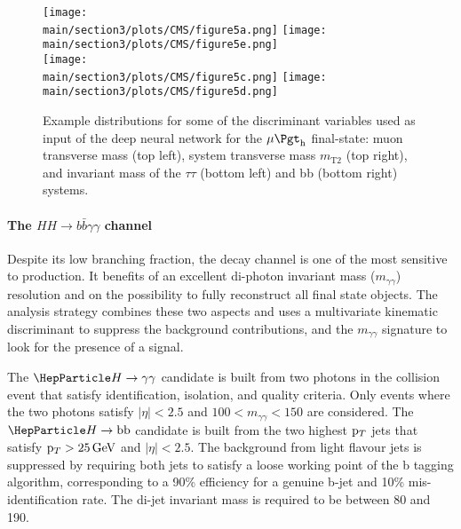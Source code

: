 \begin{figure}[!htb]
\centering 
    \texttt{[image: \\main/section3/plots/CMS/figure5a.png]}
    \texttt{[image: \\main/section3/plots/CMS/figure5e.png]}\\
    \texttt{[image: \\main/section3/plots/CMS/figure5c.png]}
    \texttt{[image: \\main/section3/plots/CMS/figure5d.png]}\\    
\caption{Example distributions for some of the discriminant variables used as input of the \bbtt deep neural network for the $\mu\tauh$ final-state: muon transverse mass (top left), system transverse mass $m_\text{T2}$ (top right), and invariant mass of the $\tau\tau$ (bottom left) and bb (bottom right) systems.} 
\label{sec3:CMSHH:fig:bbttinputs} 
\end{figure}


\paragraph{The $HH \rightarrow b\bar{b}\gamma\gamma$ channel}

Despite its low branching fraction, the \bbgg decay channel is one of the most sensitive to \HH production.
It benefits of an excellent di-photon invariant mass ($m_{\gamma\gamma}$) resolution and on the possibility to fully reconstruct all final state objects.
The analysis strategy combines these two aspects and uses a multivariate kinematic discriminant to suppress the background contributions, and the $m_{\gamma\gamma}$ signature to look for the presence of a signal.

The $\PH\to\gamma\gamma$ candidate is built from two photons in the collision event that satisfy identification, isolation, and quality criteria.
Only events where the two photons satisfy $|\eta| < 2.5$ and $100 < m_{\gamma\gamma} < 150$ are considered.
The $\PH\to\text{bb}$ candidate is built from the two highest $\mathrm{p}_{T}$ jets that satisfy $\mathrm{p}_{T} > 25\,\text{Ge\hspace{-.08em}V}$ and $|\eta| < 2.5$.
The background from light flavour jets is suppressed by requiring both jets to satisfy a loose working point of the  b tagging algorithm, corresponding to a 90\% efficiency for a genuine b-jet and 10\% mis-identification rate.
The di-jet invariant mass is required to be between 80 and 190\GeV. 

